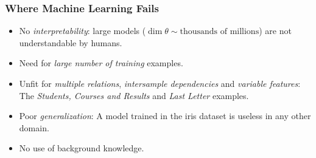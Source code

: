 \documentclass[bigger]{beamer}
\begin{document}
%
\begin{frame}
    \frametitle{Where Machine Learning Fails}
    \begin{itemize}
        \item No \emph{interpretability}: large models ($\dim \theta \sim \text{thousands of millions}$) are \alert{not understandable by humans}.
        \item Need for \emph{large number of training} examples.
        \item Unfit for \emph{multiple relations}, \emph{intersample dependencies} and \emph{variable features}: The \textit{Students, Courses and Results} and \emph{Last Letter} examples.
        \item Poor \emph{generalization}: A model trained in the iris dataset is useless in any other domain.
        \item \alert{No use of background knowledge}.
    \end{itemize}
\end{frame}
%
%
\end{document}
